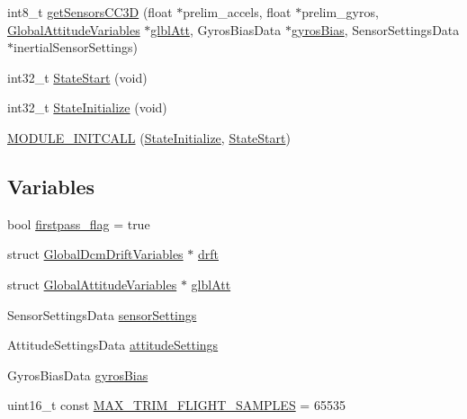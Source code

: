 \begin{DoxyCompactItemize}
\item 
int8\-\_\-t \hyperlink{group___c_c_state_gaefea6b47a03faf8d9d5af8093ccbc686}{get\-Sensors\-C\-C3\-D} (float $\ast$prelim\-\_\-accels, float $\ast$prelim\-\_\-gyros, \hyperlink{struct_global_attitude_variables}{\-Global\-Attitude\-Variables} $\ast$\hyperlink{group___c_c_state_ga76682d72011dc0109f1d5cf25a6c6da0}{glbl\-Att}, \-Gyros\-Bias\-Data $\ast$\hyperlink{group___c_c_state_ga233a2d6850e9c466f80ae6bb2ebd98e8}{gyros\-Bias}, \-Sensor\-Settings\-Data $\ast$inertial\-Sensor\-Settings)
\item 
int32\-\_\-t \hyperlink{group___c_c_state_ga9b5b60f1575dfa72f03b42b503e9095c}{\-State\-Start} (void)
\item 
int32\-\_\-t \hyperlink{group___c_c_state_gad59daafb348cfa8a33ce1d08eb2f8e5b}{\-State\-Initialize} (void)
\item 
\hyperlink{group___c_c_state_gac687f4ea48d6390c8854b0a5a1250752}{\-M\-O\-D\-U\-L\-E\-\_\-\-I\-N\-I\-T\-C\-A\-L\-L} (\hyperlink{group___c_c_state_gad59daafb348cfa8a33ce1d08eb2f8e5b}{\-State\-Initialize}, \hyperlink{group___c_c_state_ga9b5b60f1575dfa72f03b42b503e9095c}{\-State\-Start})
\end{DoxyCompactItemize}
\subsection*{\-Variables}
\begin{DoxyCompactItemize}
\item 
bool \hyperlink{group___c_c_state_ga82c3e02e8def62d93a337dc338c4d6cd}{firstpass\-\_\-flag} = true
\item 
struct \hyperlink{struct_global_dcm_drift_variables}{\-Global\-Dcm\-Drift\-Variables} $\ast$ \hyperlink{group___c_c_state_ga89657be5e41cdb8b74d42e587333115a}{drft}
\item 
struct \hyperlink{struct_global_attitude_variables}{\-Global\-Attitude\-Variables} $\ast$ \hyperlink{group___c_c_state_ga76682d72011dc0109f1d5cf25a6c6da0}{glbl\-Att}
\item 
\-Sensor\-Settings\-Data \hyperlink{group___c_c_state_ga7e2b26cdc0322ab9457559aa2b94f8fc}{sensor\-Settings}
\item 
\-Attitude\-Settings\-Data \hyperlink{group___c_c_state_ga8f6543ab52bafea6c0858baeeae8db59}{attitude\-Settings}
\item 
\-Gyros\-Bias\-Data \hyperlink{group___c_c_state_ga233a2d6850e9c466f80ae6bb2ebd98e8}{gyros\-Bias}
\item 
uint16\-\_\-t const \hyperlink{group___c_c_state_ga6faaeb7ea10f4d232ea751bdcebb3aef}{\-M\-A\-X\-\_\-\-T\-R\-I\-M\-\_\-\-F\-L\-I\-G\-H\-T\-\_\-\-S\-A\-M\-P\-L\-E\-S} = 65535
\end{DoxyCompactItemize}


